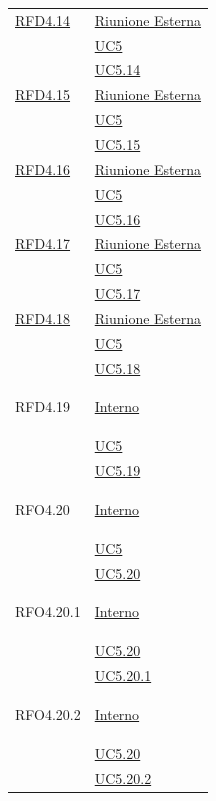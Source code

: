 \begin{itemize}
\begin{itemize}
\begin{itemize}
\begin{itemize}
\begin{longtable}{|>{\centering}m{5cm}|m{5cm}<{\centering}|}
\hyperlink{RFD4.14}{RFD4.14} & \hyperlink{Riunione Esterna}{Riunione Esterna}\\
& \hyperref[UC5]{UC5}\\
& \hyperref[UC5.14]{UC5.14}\\ \hline

\hyperlink{RFD4.15}{RFD4.15} & \hyperlink{Riunione Esterna}{Riunione Esterna}\\
& \hyperref[UC5]{UC5}\\
& \hyperref[UC5.15]{UC5.15}\\ \hline

\hyperlink{RFD4.16}{RFD4.16} & \hyperlink{Riunione Esterna}{Riunione Esterna}\\
& \hyperref[UC5]{UC5}\\
& \hyperref[UC5.16]{UC5.16}\\ \hline

\hyperlink{RFD4.17}{RFD4.17} & \hyperlink{Riunione Esterna}{Riunione Esterna}\\
& \hyperref[UC5]{UC5}\\
& \hyperref[UC5.17]{UC5.17}\\ \hline

\hyperlink{RFD4.18}{RFD4.18} & \hyperlink{Riunione Esterna}{Riunione Esterna}\\
& \hyperref[UC5]{UC5}\\
& \hyperref[UC5.18]{UC5.18}\\ \hline

\hypertarget{RFD4.19}{RFD4.19} & \hyperlink{Interno}{Interno}\\
&\hyperref[UC5]{UC5}\\
&\hyperref[UC5.19]{UC5.19}\\ \hline

\hypertarget{RFO4.20}{RFO4.20} & \hyperlink{Interno}{Interno}\\
&\hyperref[UC5]{UC5}\\
&\hyperref[UC5.20]{UC5.20}\\ \hline

\hypertarget{RFO4.20.1}{RFO4.20.1} & \hyperlink{Interno}{Interno}\\
&\hyperref[UC5.20]{UC5.20}\\
&\hyperref[UC5.20.1]{UC5.20.1}\\ \hline

\hypertarget{RFO4.20.2}{RFO4.20.2} & \hyperlink{Interno}{Interno}\\
&\hyperref[UC5.20]{UC5.20}\\
&\hyperref[UC5.20.2]{UC5.20.2}\\ \hline


\end{longtable}
\end{itemize}
\end{itemize}
\end{itemize}
\end{itemize}
